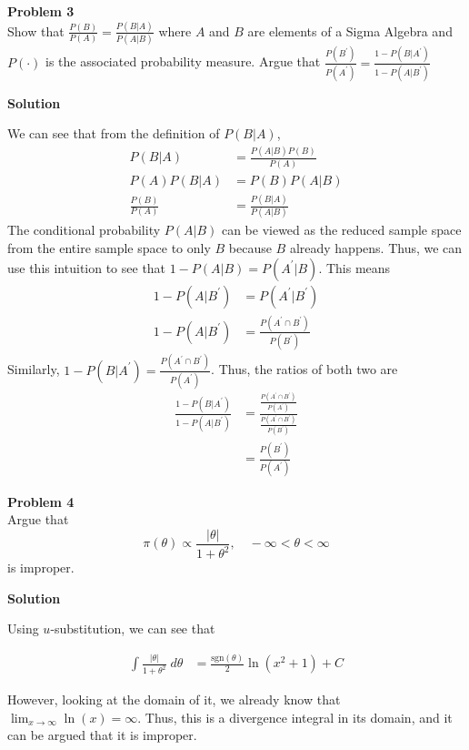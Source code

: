 \documentclass{article}
\begin{document}
\newpage
\noindent
\Large{\textbf{Problem 3}}\normalsize
\\

Show that $\frac{P(B)}{P(A)} = \frac{P(B|A)}{P(A|B)}$ where $A$ and $B$ are elements of a Sigma Algebra and $P(\cdot)$ is the associated probability measure. Argue that $\frac{P(B^{'})}{P(A^{'})} = \frac{1-P(B|A^{'})}{1-P(A|B^{'})}$

\vspace{\baselineskip}
\noindent
\textbf{Solution}

We can see that from the definition of $P(B|A)$,
\begin{align*}
    P(B|A) &= \frac{P(A|B) P(B)}{P(A)} \\
    P(A)P(B|A) &= P(B)P(A|B)\\
    \frac{P(B)}{P(A)} &= \frac{P(B|A)}{P(A|B)}
\end{align*}
The conditional probability $P(A|B)$ can be viewed as the reduced sample space from the entire sample space to only $B$ because $B$ already happens. Thus, we can use this intuition to see that $1-P(A|B) = P(A^{'}|B)$. This means
\begin{align*}
    1-P(A|B^{'}) &= P(A^{'}|B^{'})\\
    1-P(A|B^{'}) &= \frac{P(A^{'}\cap B^{'})}{P(B^{'})} 
\end{align*}
Similarly, $1-P(B|A^{'}) = \frac{P(A^{'}\cap B^{'})}{P(A^{'})}$. Thus, the ratios of both two are 
\begin{align*}
    \frac{1-P(B|A^{'})}{1-P(A|B^{'})} &= \frac{\frac{P(A^{'}\cap B^{'})}{P(A^{'})}}{\frac{P(A^{'}\cap B^{'})}{P(B^{'})}}\\
    &= \frac{P(B^{'})}{P(A^{'})}
\end{align*}

\vspace{\baselineskip}
\noindent
\Large{\textbf{Problem 4}}\normalsize
\\

Argue that \[\pi(\theta) \propto \frac{|\theta|}{1+\theta^2},\quad -\infty < \theta < \infty\]
is improper.

\vspace{\baselineskip}
\noindent
\textbf{Solution}

Using $u$-substitution, we can see that

\begin{align*}
    \int \frac{|\theta|}{1+\theta^2}\; d\theta &= \frac{\text{sgn}(\theta)}{2}\ln\left(x^2 + 1\right) + C
\end{align*}

However, looking at the domain of it, we already know that $\lim_{x\rightarrow \infty} \ln(x) = \infty$. Thus, this is a divergence integral in its domain, and it can be argued that it is improper.
\end{document}
